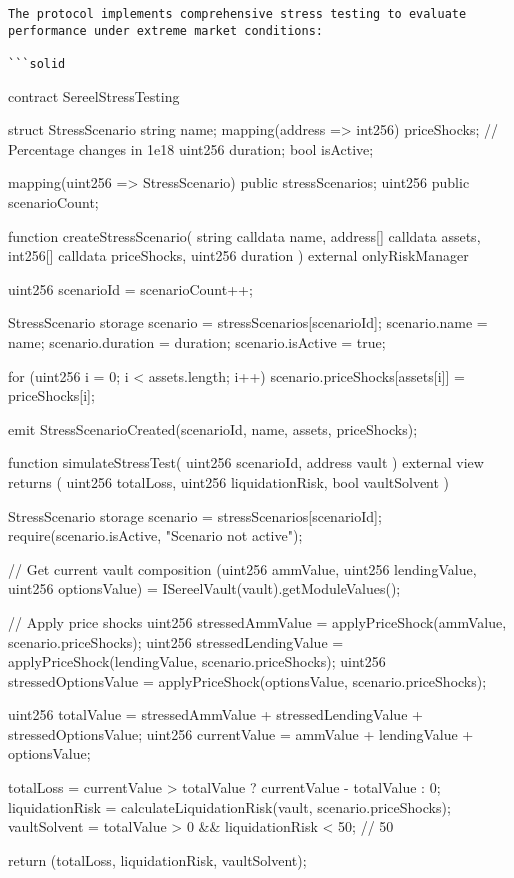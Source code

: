 \documentclass[12pt]{article}
\begin{document}
\begin{lstlisting}
The protocol implements comprehensive stress testing to evaluate performance under extreme market conditions:

```solid
\end{lstlisting}
contract SereelStressTesting {    struct StressScenario {        string name;        mapping(address => int256) priceShocks; // Percentage changes in 1e18        uint256 duration;        bool isActive;    }

    mapping(uint256 => StressScenario) public stressScenarios;    uint256 public scenarioCount;

    function createStressScenario(        string calldata name,        address[] calldata assets,        int256[] calldata priceShocks,        uint256 duration    ) external onlyRiskManager {        uint256 scenarioId = scenarioCount++;

        StressScenario storage scenario = stressScenarios[scenarioId];        scenario.name = name;        scenario.duration = duration;        scenario.isActive = true;

        for (uint256 i = 0; i < assets.length; i++) {            scenario.priceShocks[assets[i]] = priceShocks[i];        }

        emit StressScenarioCreated(scenarioId, name, assets, priceShocks);    }

    function simulateStressTest(        uint256 scenarioId,        address vault    ) external view returns (        uint256 totalLoss,        uint256 liquidationRisk,        bool vaultSolvent    ) {        StressScenario storage scenario = stressScenarios[scenarioId];        require(scenario.isActive, "Scenario not active");

        // Get current vault composition        (uint256 ammValue, uint256 lendingValue, uint256 optionsValue) = ISereelVault(vault).getModuleValues();

        // Apply price shocks        uint256 stressedAmmValue = applyPriceShock(ammValue, scenario.priceShocks);        uint256 stressedLendingValue = applyPriceShock(lendingValue, scenario.priceShocks);        uint256 stressedOptionsValue = applyPriceShock(optionsValue, scenario.priceShocks);

        uint256 totalValue = stressedAmmValue + stressedLendingValue + stressedOptionsValue;        uint256 currentValue = ammValue + lendingValue + optionsValue;

        totalLoss = currentValue > totalValue ? currentValue - totalValue : 0;        liquidationRisk = calculateLiquidationRisk(vault, scenario.priceShocks);        vaultSolvent = totalValue > 0 && liquidationRisk < 50; // 50%

        return (totalLoss, liquidationRisk, vaultSolvent);    }}
\end{document}
